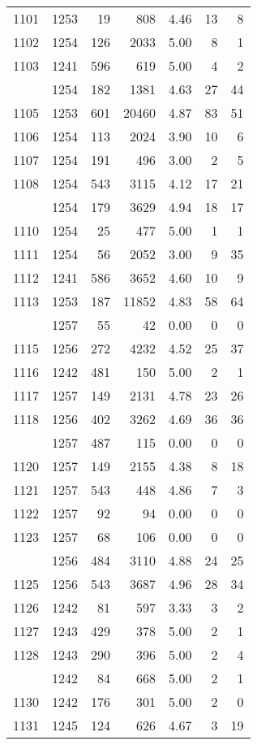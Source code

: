 \documentclass[
]{article}
\begin{document}
\begin{table}
\begin{tabular}[t]{lrrrrrr}
1101 & 1253 & 19 & 808 & 4.46 & 13 & 8\\
1102 & 1254 & 126 & 2033 & 5.00 & 8 & 1\\
1103 & 1241 & 596 & 619 & 5.00 & 4 & 2\\
\addlinespace
1104 & 1254 & 182 & 1381 & 4.63 & 27 & 44\\
1105 & 1253 & 601 & 20460 & 4.87 & 83 & 51\\
1106 & 1254 & 113 & 2024 & 3.90 & 10 & 6\\
1107 & 1254 & 191 & 496 & 3.00 & 2 & 5\\
1108 & 1254 & 543 & 3115 & 4.12 & 17 & 21\\
\addlinespace
1109 & 1254 & 179 & 3629 & 4.94 & 18 & 17\\
1110 & 1254 & 25 & 477 & 5.00 & 1 & 1\\
1111 & 1254 & 56 & 2052 & 3.00 & 9 & 35\\
1112 & 1241 & 586 & 3652 & 4.60 & 10 & 9\\
1113 & 1253 & 187 & 11852 & 4.83 & 58 & 64\\
\addlinespace
1114 & 1257 & 55 & 42 & 0.00 & 0 & 0\\
1115 & 1256 & 272 & 4232 & 4.52 & 25 & 37\\
1116 & 1242 & 481 & 150 & 5.00 & 2 & 1\\
1117 & 1257 & 149 & 2131 & 4.78 & 23 & 26\\
1118 & 1256 & 402 & 3262 & 4.69 & 36 & 36\\
\addlinespace
1119 & 1257 & 487 & 115 & 0.00 & 0 & 0\\
1120 & 1257 & 149 & 2155 & 4.38 & 8 & 18\\
1121 & 1257 & 543 & 448 & 4.86 & 7 & 3\\
1122 & 1257 & 92 & 94 & 0.00 & 0 & 0\\
1123 & 1257 & 68 & 106 & 0.00 & 0 & 0\\
\addlinespace
1124 & 1256 & 484 & 3110 & 4.88 & 24 & 25\\
1125 & 1256 & 543 & 3687 & 4.96 & 28 & 34\\
1126 & 1242 & 81 & 597 & 3.33 & 3 & 2\\
1127 & 1243 & 429 & 378 & 5.00 & 2 & 1\\
1128 & 1243 & 290 & 396 & 5.00 & 2 & 4\\
\addlinespace
1129 & 1242 & 84 & 668 & 5.00 & 2 & 1\\
1130 & 1242 & 176 & 301 & 5.00 & 2 & 0\\
1131 & 1245 & 124 & 626 & 4.67 & 3 & 19\\

\end{tabular}
\end{table}
\end{document}

